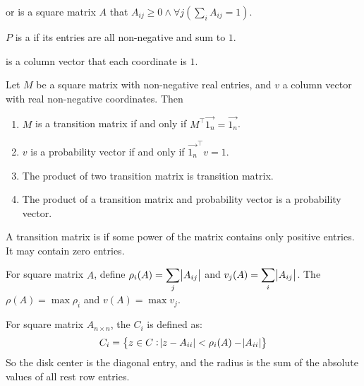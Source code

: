 \begin{definition}
     or  is a square matrix $A$ that $A_{ij} \geq 0 \wedge \forall j \left(\sum_{i} A_{ij} = 1 \right)$.
\end{definition}

\begin{definition}
    $P$ is a  if its entries are all non-negative and sum to $1$.
\end{definition}

\begin{definition}
     is a column vector that each coordinate is $1$.
\end{definition}

\begin{theorem}
    Let $M$ be a square matrix with non-negative real entries, and $v$ a column vector with real non-negative coordinates. Then
    \begin{enumerate}
        \item $M$ is a transition matrix if and only if $M^\top \vec{1_n} = \vec{1_n}$.
        \item $v$ is a probability vector if and only if $\vec{1_n}^\top v = 1$.
        \item The product of two transition matrix is transition matrix.
        \item The product of a transition matrix and probability vector is a probability vector.
    \end{enumerate}    
\end{theorem}

\begin{definition}
    A transition matrix is  if some power of the matrix contains only positive entries. It may contain zero entries.
\end{definition}

\begin{definition}
    For square matrix $A$, define $\displaystyle \rho_i (A) = \sum_j \abs{A_{ij}}$ and $\displaystyle v_j(A) = \sum_i \abs{A_{ij}}$. The  $\rho (A) = \max \rho_i$ and  $v(A) = \max v_j$.
\end{definition}

\begin{definition}
    For square matrix $A_{n \times n}$, the  $C_i$ is defined as:
    \begin{equation}
        C_i = \set{z \in C: \abs{z - A_{ii}} < \rho_i (A) - \abs{A_{ii}}}
    \end{equation}
    So the disk center is the diagonal entry, and the radius is the sum of the absolute values of all rest row entries.
\end{definition}


